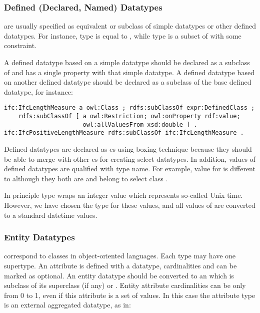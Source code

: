 \subsubsection{Defined (Declared, Named) Datatypes} are usually specified as equivalent or subclass of simple data\-types or other defined data\-types. For instance, type  is equal to , while type  is a subset of  with some constraint.

A defined data\-type based on a simple data\-type should be declared as a subclass of  and has a single property  with that simple data\-type. A defined data\-type based on another defined data\-type should be declared as a subclass of the base defined data\-type, for instance:

\begin{lstlisting}
ifc:IfcLengthMeasure a owl:Class ; rdfs:subClassOf expr:DefinedClass ;
    rdfs:subClassOf [ a owl:Restriction; owl:onProperty rdf:value;
                      owl:allValuesFrom xsd:double ] .
ifc:IfcPositiveLengthMeasure rdfs:subClassOf ifc:IfcLengthMeasure .
\end{lstlisting}


Defined data\-types are declared as es using boxing technique because they should be able to merge with other es for creating select data\-types. In addition, values of defined data\-types are qualified with type name. For example, value  for  is different to  although they both are  and belong to select class .

In principle type  wraps an integer value which represents so-called Unix time. However, we have chosen the type  for these values, and all values of  are converted to a standard datetime values.



\subsubsection{Entity Datatypes} correspond to classes in object-oriented languages. Each type may have one super\-type. An attribute is defined with a data\-type, cardinalities and can be marked as optional. An entity data\-type should be converted to an  which is subclass of its superclass (if any) or . Entity attribute cardinalities can be only from 0 to 1, even if this attribute is a set of values. In this case the attribute type is an external aggregated data\-type, as in:


